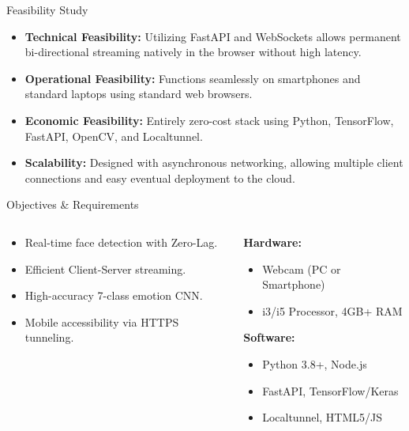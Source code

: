 \documentclass[aspectratio=169]{beamer}
\begin{document}
\begin{frame}{Feasibility Study}
\begin{itemize}
    \item \textbf{Technical Feasibility:} Utilizing FastAPI and WebSockets allows permanent bi-directional streaming natively in the browser without high latency.
    \item \textbf{Operational Feasibility:} Functions seamlessly on smartphones and standard laptops using standard web browsers.
    \item \textbf{Economic Feasibility:} Entirely zero-cost stack using Python, TensorFlow, FastAPI, OpenCV, and Localtunnel. 
    \item \textbf{Scalability:} Designed with asynchronous networking, allowing multiple client connections and easy eventual deployment to the cloud.
\end{itemize}
\end{frame}

\begin{frame}{Objectives \& Requirements}

\begin{columns}[T]
\begin{tcolorbox}[colback=blue!5,colframe=blue!40!black,title=\textbf{Core Objectives}]
\small
\begin{itemize}
    \item Real-time face detection with Zero-Lag.
    \item Efficient Client-Server streaming.
    \item High-accuracy 7-class emotion CNN.
    \item Mobile accessibility via HTTPS tunneling.
\end{itemize}
\end{tcolorbox}

\begin{tcolorbox}[colback=blue!5,colframe=blue!40!black,title=\textbf{System Requirements}]
\small
\textbf{Hardware:}
\begin{itemize}
    \item Webcam (PC or Smartphone)
    \item i3/i5 Processor, 4GB+ RAM
\end{itemize}
\textbf{Software:}
\begin{itemize}
    \item Python 3.8+, Node.js
    \item FastAPI, TensorFlow/Keras
    \item Localtunnel, HTML5/JS
\end{itemize}
\end{tcolorbox}
\end{columns}

\end{frame}
\end{document}
